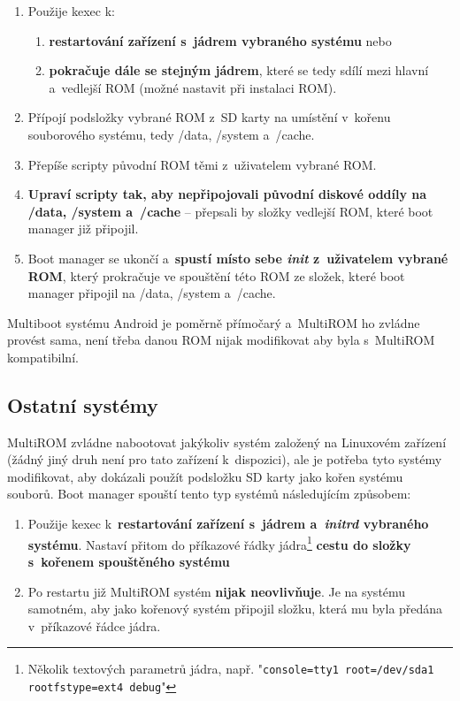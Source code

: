 \documentclass[12pt, a4paper, oneside]{article}
\newcommand{\B}{\textbf} %
\newcommand{\It}{\textit}  %
\begin{document}
\begin{enumerate}
    \item Použije kexec k:
    \begin{enumerate}
        \item \B{restartování zařízení s~jádrem vybraného systému} nebo
        \item \B{pokračuje dále se stejným jádrem}, které se tedy sdílí mezi hlavní a~vedlejší ROM (možné nastavit při instalaci ROM).
    \end{enumerate}
    \item Přípojí podsložky vybrané ROM z~SD karty na umístění v~kořenu souborového systému, tedy /data, /system a~/cache.
    \item Přepíše scripty původní ROM těmi z~uživatelem vybrané ROM.
    \item \B{Upraví scripty tak, aby nepřipojovali původní diskové oddíly na /data, /system a~/cache} -- přepsali by složky vedlejší ROM, které boot manager již připojil.
    \item Boot manager se ukončí a~\B{spustí místo sebe \It{init} z~uživatelem vybrané ROM}, který prokračuje ve spouštění této ROM ze složek, které boot manager připojil na /data, /system a~/cache.
\end{enumerate}

Multiboot systému Android je poměrně přímočarý a~MultiROM ho zvládne provést sama, není třeba danou ROM nijak modifikovat aby byla s~MultiROM kompatibilní.

\subsection{Ostatní systémy}
MultiROM zvládne nabootovat jakýkoliv systém založený na Linuxovém zařízení (žádný jiný druh není pro tato zařízení k~dispozici), ale je potřeba tyto systémy modifikovat, aby dokázali použít podsložku SD karty jako kořen systému souborů. Boot manager spouští tento typ systémů následujícím způsobem:
\begin{enumerate}
    \item Použije kexec k~\B{restartování zařízení s~jádrem a~\It{initrd} vybraného systému}. Nastaví přitom do příkazové řádky jádra\footnote{Několik textových parametrů jádra, např. "\verb-console=tty1 root=/dev/sda1 rootfstype=ext4 debug-"} \B{cestu do složky s~kořenem spouštěného systému}
    \item Po restartu již MultiROM systém \B{nijak neovlivňuje}. Je na systému samotném, aby jako kořenový systém připojil složku, která mu byla předána v~příkazové řádce jádra.
\end{enumerate}
\end{document}
